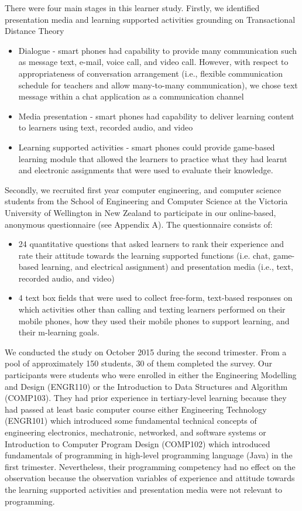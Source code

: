 There were four main stages in this learner study. Firstly, we identified presentation media and learning supported activities grounding on Transactional Distance Theory
\begin{itemize} 
\item Dialogue - smart phones had capability to provide many communication such as message text, e-mail, voice call, and video call. However, with respect to appropriateness of conversation arrangement (i.e., flexible communication schedule for teachers and allow many-to-many communication), we chose text message within a chat application as a communication channel
\item Media presentation - smart phones had capability to deliver learning content to learners using text, recorded audio, and video
\item Learning supported activities - smart phones could provide game-based learning module that allowed the learners to practice what they had learnt and electronic assignments that were used to evaluate their knowledge. 
\end{itemize} 

Secondly, we recruited first year computer engineering, and computer science students from the School of Engineering and Computer Science at the Victoria University of Wellington in New Zealand to participate in our online-based, anonymous questionnaire (see Appendix A). The questionnaire consists of: 
\begin{itemize} 
\item 24 quantitative questions that asked learners to rank their experience and rate their attitude towards the learning supported functions (i.e. chat, game-based learning, and electrical assignment) and presentation media (i.e., text, recorded audio, and video)
\item 4 text box fields that were used to collect free-form, text-based responses on which activities other than calling and texting learners performed on their mobile phones, how they used their mobile phones to support learning, and their m-learning goals. 
\end{itemize}

We conducted the study on October 2015 during the second trimester. From a pool of approximately 150 students, 30 of them completed the survey. Our participants were students who were enrolled in either the Engineering Modelling and Design (ENGR110) or the Introduction to Data Structures and Algorithm (COMP103). They had prior experience in tertiary-level learning because they had passed at least basic computer course either Engineering Technology (ENGR101) which introduced some fundamental technical concepts of engineering electronics, mechatronic, networked, and software systems or Introduction to Computer Program Design (COMP102) which introduced fundamentals of programming in high-level programming language (Java) in the first trimester. Nevertheless, their programming competency had no effect on the observation because the observation variables of experience and attitude towards the learning supported activities and presentation media were not relevant to programming. 

